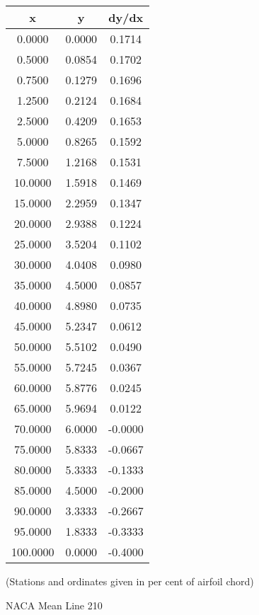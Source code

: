 \documentclass[11pt]{book}
\begin{document}
 \vspace{8mm}
 \begin{tabular}{|c|c|c|}  \hline
 x & y & dy/dx \\
 \hline
0.0000 & 0.0000 & 0.1714 \\
0.5000 & 0.0854 & 0.1702 \\
0.7500 & 0.1279 & 0.1696 \\
1.2500 & 0.2124 & 0.1684 \\
2.5000 & 0.4209 & 0.1653 \\
5.0000 & 0.8265 & 0.1592 \\
7.5000 & 1.2168 & 0.1531 \\
10.0000 & 1.5918 & 0.1469 \\
15.0000 & 2.2959 & 0.1347 \\
20.0000 & 2.9388 & 0.1224 \\
25.0000 & 3.5204 & 0.1102 \\
30.0000 & 4.0408 & 0.0980 \\
35.0000 & 4.5000 & 0.0857 \\
40.0000 & 4.8980 & 0.0735 \\
45.0000 & 5.2347 & 0.0612 \\
50.0000 & 5.5102 & 0.0490 \\
55.0000 & 5.7245 & 0.0367 \\
60.0000 & 5.8776 & 0.0245 \\
65.0000 & 5.9694 & 0.0122 \\
70.0000 & 6.0000 & -0.0000 \\
75.0000 & 5.8333 & -0.0667 \\
80.0000 & 5.3333 & -0.1333 \\
85.0000 & 4.5000 & -0.2000 \\
90.0000 & 3.3333 & -0.2667 \\
95.0000 & 1.8333 & -0.3333 \\
100.0000 & 0.0000 & -0.4000 \\
 \hline
 \end{tabular}
 \vspace{8mm}

(Stations and ordinates given in per cent of airfoil chord)

 \newpage
 \label{ml210}
 \begin{Large}
 NACA Mean Line 210
 \end{Large}
  
\end{document}
